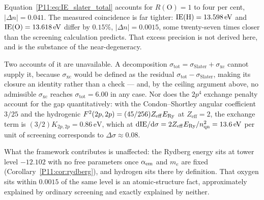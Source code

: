 \begin{remark}
\label{P11:rem:sigma_xc_origin}
Equation~\eqref{P11:eq:IE_slater_total} accounts for
$R(\mathrm{O})=1$ to four per cent, $|\Delta n| = 0.041$.  The measured
coincidence is far tighter: $\mathrm{IE}(\mathrm{H})=13.598\,\mathrm{eV}$ and
$\mathrm{IE}(\mathrm{O})=13.618\,\mathrm{eV}$ differ by $0.15\%$,
$|\Delta n| = 0.0015$, some twenty-seven times closer than the
screening calculation predicts.  That excess precision is not derived
here, and is the substance of the near-degeneracy.

Two accounts of it are unavailable.  A decomposition
$\sigma_\mathrm{tot} = \sigma_\mathrm{Slater} + \sigma_\mathrm{xc}$
cannot supply it, because $\sigma_\mathrm{xc}$ would be defined as the
residual $\sigma_\mathrm{tot}-\sigma_\mathrm{Slater}$, making its
closure an identity rather than a check --- and, by the ceiling
argument above, no admissible $\sigma_\mathrm{xc}$ reaches
$\sigma_\mathrm{tot}=6.00$ in any case.  Nor does the $2p^4$ exchange
penalty account for the gap quantitatively: with the Condon--Shortley
angular coefficient $3/25$ and the hydrogenic
$F^2(2p,2p)=(45/256)Z_\mathrm{eff}E_{\mathrm{Ry}}$ at $Z_\mathrm{eff}=2$, the
exchange term is $(3/2)K_{2p,2p} = 0.86\,\mathrm{eV}$, which at
$\mathrm{d}\mathrm{IE}/\mathrm{d}\sigma = 2Z_\mathrm{eff}E_{\mathrm{Ry}}/n_\mathrm{qn}^2
= 13.6\,\mathrm{eV}$ per unit of screening corresponds to
$\Delta\sigma \approx 0.08$.

What the framework contributes is unaffected: the Rydberg energy sits
at tower level $-12.102$ with no free parameters once $\alpha_{\mathrm{em}}$ and $m_e$
are fixed (Corollary~\ref{P11:cor:rydberg}), and hydrogen sits there by
definition.  That oxygen sits within $0.0015$ of the same level is an
atomic-structure fact, approximately explained by ordinary screening
and exactly explained by neither.
\end{remark}

